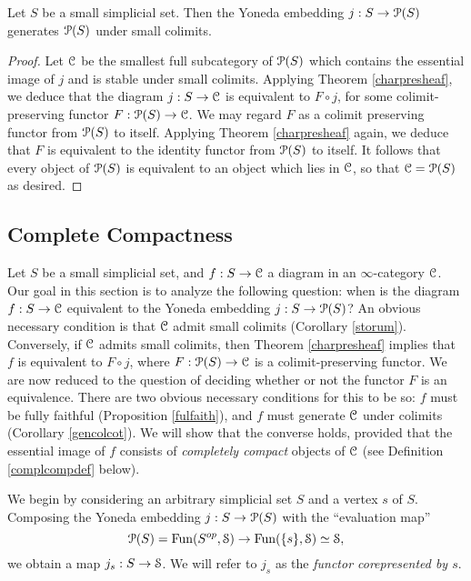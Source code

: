 \begin{corollary}\label{gencolcot}
Let $S$ be a small simplicial set. Then the Yoneda embedding $j: S \rightarrow \operatorname{\mathcal{P}}(S)$ generates $\operatorname{\mathcal{P}}(S)$ under small colimits.
\end{corollary}

\begin{proof}
Let $\operatorname{\mathcal{C}}$ be the smallest full subcategory of $\operatorname{\mathcal{P}}(S)$ which contains the essential image of
$j$ and is stable under small colimits. Applying Theorem \ref{charpresheaf}, we deduce that
the diagram $j: S \rightarrow \operatorname{\mathcal{C}}$ is equivalent to $F \circ j$, for some colimit-preserving
functor $F: \operatorname{\mathcal{P}}(S) \rightarrow \operatorname{\mathcal{C}}$. We may regard $F$ as a colimit preserving functor
from $\operatorname{\mathcal{P}}(S)$ to itself. Applying Theorem \ref{charpresheaf} again, we deduce that $F$ is
equivalent to the identity functor from $\operatorname{\mathcal{P}}(S)$ to itself. It follows that every object
of $\operatorname{\mathcal{P}}(S)$ is equivalent to an object which lies in $\operatorname{\mathcal{C}}$, so that $\operatorname{\mathcal{C}} = \operatorname{\mathcal{P}}(S)$ as desired.
\end{proof}

\subsection{Complete Compactness}\label{completecomp}

Let $S$ be a small simplicial set, and $f: S \rightarrow \operatorname{\mathcal{C}}$ a diagram in an $\infty$-category $\operatorname{\mathcal{C}}$. Our goal in this section is to analyze the following question: when is the diagram $f: S \rightarrow \operatorname{\mathcal{C}}$ equivalent to the Yoneda embedding $j: S \rightarrow \operatorname{\mathcal{P}}(S)$?
An obvious necessary condition is that $\operatorname{\mathcal{C}}$ admit small colimits (Corollary \ref{storum}). 
Conversely, if $\operatorname{\mathcal{C}}$ admits small colimits, then Theorem \ref{charpresheaf} implies that $f$ is equivalent to $F \circ j$, where $F: \operatorname{\mathcal{P}}(S) \rightarrow \operatorname{\mathcal{C}}$ is a colimit-preserving functor.
We are now reduced to the question of deciding whether or not the functor $F$ is an equivalence.
There are two obvious necessary conditions for this to be so: $f$ must be fully faithful (Proposition \ref{fulfaith}), and $f$ must generate $\operatorname{\mathcal{C}}$ under colimits (Corollary \ref{gencolcot}). We will show that the converse holds, provided that the essential image of $f$ consists of {\em completely compact} objects of $\operatorname{\mathcal{C}}$ (see Definition \ref{complcompdef} below).

We begin by considering an arbitrary simplicial set $S$ and a vertex $s$ of $S$.
Composing the Yoneda embedding $j: S \rightarrow \operatorname{\mathcal{P}}(S)$ with the ``evaluation map''
$$\operatorname{\mathcal{P}}(S)  = \operatorname{Fun}(S^{op}, \operatorname{\mathcal{S}}) \rightarrow
\operatorname{Fun}( \{s\}, \operatorname{\mathcal{S}}) \simeq \operatorname{\mathcal{S}},$$
we obtain a map $j_{s}: S \rightarrow \operatorname{\mathcal{S}}$. We will refer to $j_{s}$
as the {\it functor corepresented by $s$}.

